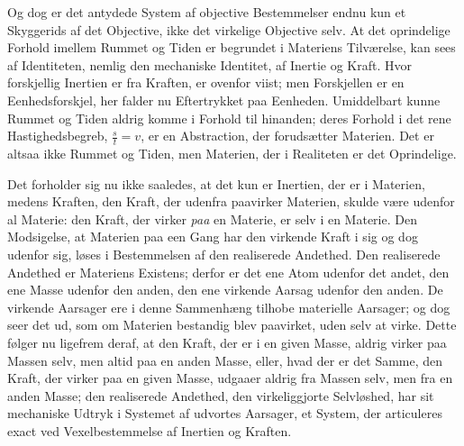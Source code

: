 \documentclass[12pt]{book}
\newcommand{\opage}[1]{\marginnote{\footnotesize\textit{[#1]}}}
\begin{document}
Og dog er det antydede System af objective Bestemmelser endnu kun et Skyggerids af det
Objective, ikke det virkelige Objective selv. At det oprindelige Forhold imellem Rummet og
Tiden er begrundet i Materiens Tilværelse, kan sees af Identiteten, nemlig den mechaniske
Identitet, af Inertie og Kraft. Hvor forskjellig Inertien er fra Kraften, er ovenfor viist;
men Forskjellen er en Eenhedsforskjel, her falder nu Eftertrykket paa Eenheden.
Umiddelbart kunne Rummet og
\opage{349} Tiden aldrig komme i Forhold til hinanden; deres Forhold i det rene Hastighedsbegreb,
$\frac{s}{t} = v$, er en Abstraction, der forudsætter Materien. Det er altsaa ikke Rummet
og Tiden, men Materien, der i Realiteten er det Oprindelige.

Det forholder sig nu ikke saaledes, at det kun er Inertien, der er i Materien, medens
Kraften, den Kraft, der udenfra paavirker Materien, skulde være udenfor al Materie: den
Kraft, der virker \emph{paa} en Materie, er selv i en Materie. Den Modsigelse, at Materien
paa een Gang har den virkende Kraft i sig og dog udenfor sig, løses i Bestemmelsen af den
realiserede Andethed. Den realiserede Andethed er Materiens Existens; derfor er det ene
Atom udenfor det andet, den ene Masse udenfor den anden, den ene virkende Aarsag udenfor
den anden. De virkende Aarsager ere i denne Sammenhæng tilhobe materielle Aarsager; og dog
seer det ud, som om Materien bestandig blev paavirket, uden selv at virke. Dette følger nu
ligefrem deraf, at den Kraft, der er i en given Masse, aldrig virker paa Massen selv, men
altid paa en anden Masse, eller, hvad der er det Samme, den Kraft, der virker paa en given
Masse, udgaaer aldrig fra Massen selv, men fra en anden Masse; den realiserede Andethed,
den virkeliggjorte Selvløshed, har sit mechaniske Udtryk i Systemet af udvortes Aarsager,
et System, der articuleres exact ved Vexelbestemmelse af Inertien og Kraften.
\end{document}

